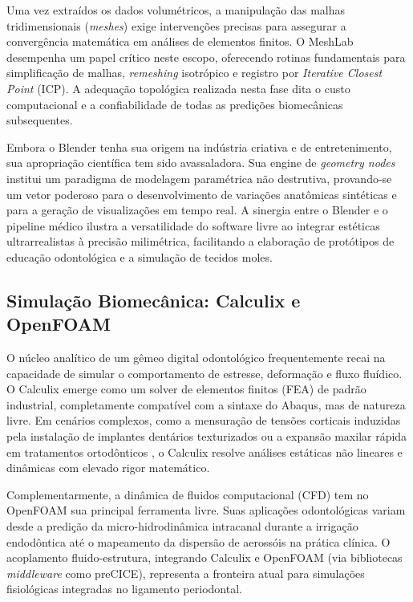 Uma vez extraídos os dados volumétricos, a manipulação das malhas tridimensionais (\textit{meshes}) exige intervenções precisas para assegurar a convergência matemática em análises de elementos finitos. O MeshLab desempenha um papel crítico neste escopo, oferecendo rotinas fundamentais para simplificação de malhas, \textit{remeshing} isotrópico e registro por \textit{Iterative Closest Point} (ICP). A adequação topológica realizada nesta fase dita o custo computacional e a confiabilidade de todas as predições biomecânicas subsequentes.

Embora o Blender tenha sua origem na indústria criativa e de entretenimento, sua apropriação científica tem sido avassaladora. Sua engine de \textit{geometry nodes} institui um paradigma de modelagem paramétrica não destrutiva, provando-se um vetor poderoso para o desenvolvimento de variações anatômicas sintéticas e para a geração de visualizações em tempo real. A sinergia entre o Blender e o pipeline médico ilustra a versatilidade do software livre ao integrar estéticas ultrarrealistas à precisão milimétrica, facilitando a elaboração de protótipos de educação odontológica e a simulação de tecidos moles.

\subsection{Simulação Biomecânica: Calculix e OpenFOAM}

O núcleo analítico de um gêmeo digital odontológico frequentemente recai na capacidade de simular o comportamento de estresse, deformação e fluxo fluídico. O Calculix emerge como um solver de elementos finitos (FEA) de padrão industrial, completamente compatível com a sintaxe do Abaqus, mas de natureza livre. Em cenários complexos, como a mensuração de tensões corticais induzidas pela instalação de implantes dentários texturizados \cite{alshadidi2024surface} ou a expansão maxilar rápida em tratamentos ortodônticos \cite{li2024aligner}, o Calculix resolve análises estáticas não lineares e dinâmicas com elevado rigor matemático.

Complementarmente, a dinâmica de fluidos computacional (CFD) tem no OpenFOAM sua principal ferramenta livre. Suas aplicações odontológicas variam desde a predição da micro-hidrodinâmica intracanal durante a irrigação endodôntica \cite{elsaid2025digital} até o mapeamento da dispersão de aerossóis na prática clínica. O acoplamento fluido-estrutura, integrando Calculix e OpenFOAM (via bibliotecas \textit{middleware} como preCICE), representa a fronteira atual para simulações fisiológicas integradas no ligamento periodontal.

